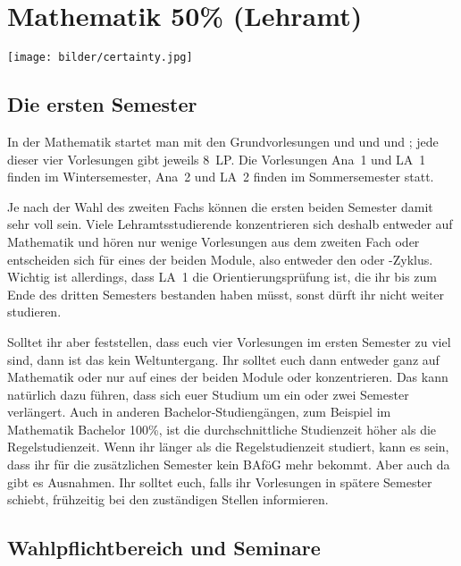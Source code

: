 \section{Mathematik 50\% (Lehramt)}

\begin{figure*}[b]
  \centering
  \texttt{[image: bilder/certainty.jpg]}
\end{figure*}

\subsection{Die ersten Semester}

In der Mathematik startet man mit den Grundvorlesungen  und  und  und ; jede dieser vier Vorlesungen gibt jeweils 8~\gls{LP}. Die Vorlesungen \gls{Ana}~1 und \gls{LA}~1 finden im Wintersemester, \gls{Ana}~2 und \gls{LA}~2 finden im Sommersemester statt.

Je nach der Wahl des zweiten Fachs können die ersten beiden Semester damit sehr voll sein. Viele Lehramtsstudierende konzentrieren sich deshalb entweder auf Mathematik und hören nur wenige Vorlesungen aus dem zweiten Fach oder entscheiden sich für eines der beiden Module, also entweder den  oder -Zyklus. Wichtig ist allerdings, dass \gls{LA}~1 die Orientierungsprüfung ist, die ihr bis zum Ende des dritten Semesters bestanden haben müsst, sonst dürft ihr nicht weiter studieren.

Solltet ihr aber feststellen, dass euch vier Vorlesungen im ersten Semester zu viel sind, dann ist das kein Weltuntergang. Ihr solltet euch dann entweder ganz auf Mathematik oder nur auf eines der beiden Module  oder  konzentrieren. Das kann natürlich dazu führen, dass sich euer Studium um ein oder zwei Semester verlängert. Auch in anderen Bachelor-Studiengängen, zum Beispiel im Mathematik Bachelor 100\%, ist die durchschnittliche Studienzeit höher als die Regelstudienzeit. Wenn ihr länger als die Regelstudienzeit studiert, kann es sein, dass ihr für die zusätzlichen Semester kein BAföG mehr bekommt. Aber auch da gibt es Ausnahmen. Ihr solltet euch, falls ihr Vorlesungen in spätere Semester schiebt, frühzeitig bei den zuständigen Stellen informieren.

\subsection{Wahlpflichtbereich und Seminare}

